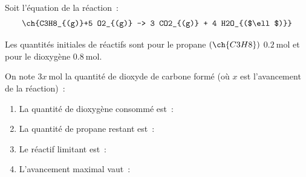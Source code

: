 Soit l'équation de la réaction~:
\[
    \ch{C3H8_{(g)}+5 O2_{(g)} -> 3 CO2_{(g)} + 4 H2O_{($\ell$)}}
\]

Les quantités initiales de réactifs sont pour le propane $(\ch{C3H8})$
$\qty{0.2}{\mol}$ et pour le dioxygène $\qty{0.8}{\mol}$.

On note $3x~\unit{\mol}$ la quantité de dioxyde de carbone formé (où $x$ est
l'avancement de la réaction)~:
\begin{enumerate}
    \item La quantité de dioxygène consommé est~: \par
    \item La quantité de propane restant est~: \par
    \item Le réactif limitant est~: \par
    \item L'avancement maximal vaut~: \par
\end{enumerate}


